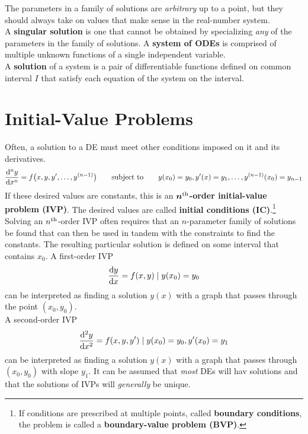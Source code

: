 \documentclass[../Differential Equations.tex]{subfiles}
\begin{document}
			The parameters in a family of solutions are \textit{arbitrary} up to a point, but they should always take on values that make sense in the real-number system. \\
			A \textbf{singular solution} is one that cannot be obtained by specializing \textit{any} of the parameters in the family of solutions.
			A \textbf{system of ODEs} is comprised of multiple unknown functions of a single independent variable. \\
			A \textbf{solution} of a system is a pair of differentiable functions defined on common interval \(I\) that satisfy each equation of the system on the interval.
	\section{Initial-Value Problems}
		Often, a solution to a DE must meet other conditions imposed on it and its derivatives.
			\[\dv[n]{y}{x} = f\bigl(x, y, y', \ldots, y^{(n - 1)}\bigr) \qquad\text{subject to}\qquad y(x_0) = y_0, y'(x) = y_1, \ldots, y^{(n - 1)}(x_0) = y_{n - 1}\]
			If these desired values are constants, this is an \textbf{\(\bm{n^{\text{th}}}\)-order initial-value problem (IVP)}. The desired values are called \textbf{initial conditions (IC)}.\footnote{
					If conditions are prescribed at multiple points, called \textbf{boundary conditions}, the problem is called a \textbf{boundary-value problem (BVP)}.
				} \\
		Solving an \(n^{\text{th}}\)-order IVP often requires that an \(n\)-parameter family of solutions be found that can then be used in tandem with the constraints to find the constants. The resulting particular solution is defined on some interval that contains \(x_0\).
			A first-order IVP
				\[\dv{y}{x} = f(x, y) \mid y(x_0) = y_0\]
				can be interpreted as finding a solution \(y(x)\) with a graph that passes through the point \((x_0, y_0)\). \\
			A second-order IVP
				\[\dv[2]{y}{x} = f(x, y, y') \mid y(x_0) = y_0, y'(x_0) = y_1\]
				can be interpreted as finding a solution \(y(x)\) with a graph that passes through \((x_0, y_0)\) with slope \(y_1\).
			It can be assumed that \textit{most} DEs will hav solutions and that the solutions of IVPs will \textit{generally} be unique. \\
\end{document}
